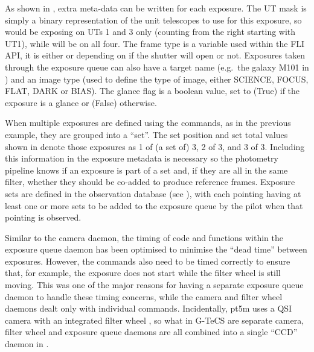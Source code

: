 \begin{colsection}
As shown in , extra meta-data can be written for each exposure. The UT mask is simply a binary representation of the unit telescopes to use for this exposure, so  would be exposing on UTs 1 and 3 only (counting from the right starting with UT1), while  will be on all four. The frame type is a variable used within the FLI API, it is either  or  depending on if the shutter will open or not. Exposures taken through the exposure queue can also have a target name (e.g.\ the galaxy M101 in ) and an image type (used to define the type of image, either SCIENCE, FOCUS, FLAT, DARK or BIAS). The glance flag is a boolean value, set to  (True) if the exposure is a glance or  (False) otherwise.

When multiple exposures are defined using the  commands, as in the previous  example, they are grouped into a ``set''. The set position and set total values shown in  denote those exposures as 1 of (a set of) 3, 2 of 3, and 3 of 3. Including this information in the exposure metadata is necessary so the photometry pipeline knows if an exposure is part of a set and, if they are all in the same filter, whether they should be co-added to produce reference frames. Exposure sets are defined in the observation database (see ), with each pointing having at least one or more sets to be added to the exposure queue by the pilot when that pointing is observed.

Similar to the camera daemon, the timing of code and functions within the exposure queue daemon has been optimised to minimise the ``dead time'' between exposures. However, the commands also need to be timed correctly to ensure that, for example, the exposure does not start while the filter wheel is still moving. This was one of the major reasons for having a separate exposure queue daemon to handle these timing concerns, while the camera and filter wheel daemons dealt only with individual commands. Incidentally, pt5m uses a QSI camera with an integrated filter wheel \citep{pt5m}, so what in G-TeCS are separate camera, filter wheel and exposure queue daemons are all combined into a single ``CCD'' daemon in .

\end{colsection}


